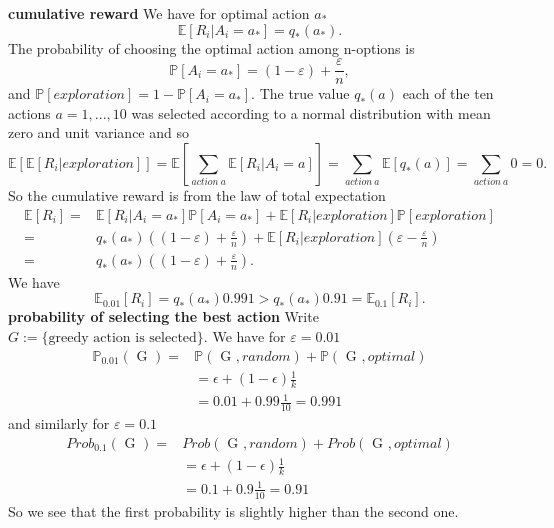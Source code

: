 \documentclass[answers]{exam}
\theoremstyle{definition}
\theoremstyle{remark}
\newcommand{\Prob}{\mathbb{P}}
\newcommand{\Proba}[1]{\mathbb{P}\left[#1\right]}
\newcommand{\Exp}{\mathbb{E}}
\newcommand{\Expe}[1]{\mathbb{E}\left[ #1\right] }
\newcommand{\e}{\varepsilon}
\begin{document}
\begin{solution}
    
\textbf{ cumulative reward}
We have for optimal action $a_{*}$
\begin{equation}
\Expe{R_{i}|A_{i}=a_{*}}=q_{*}(a_{*}).    
\end{equation}
The probability of choosing the optimal action among n-options is
\begin{equation}
\Proba{A_{i}=a_{*}}=(1-\e)+\frac{\e}{n},
\end{equation}
and $\Proba{exploration}=1- \Proba{A_{i}=a_{*}}$. The true value $q_{*}(a)$ each of the ten actions $a=1,...,10$ was selected according to a normal distribution with mean zero and unit variance and so
\begin{equation}
\Expe{\Expe{R_{i}|exploration}}=\Expe{\sum_{action~a}\Expe{R_{i}|A_{i}=a}} =\sum_{action~a}\Expe{q_{*}(a)}=\sum_{action~a}0=0.   
\end{equation}
So the cumulative reward is from the law of total expectation
\begin{align*}
\Expe{R_{i}}=&\Expe{R_{i}|A_{i}=a_{*}}\Proba{A_{i}=a_{*}}+\Expe{R_{i}|exploration}\Proba{exploration}\\    
=&q_{*}(a_{*})((1-\e)+\frac{\e}{n})+\Expe{R_{i}|exploration}(\e-\frac{\e}{n})\\   
=&q_{*}(a_{*})((1-\e)+\frac{\e}{n}).
\end{align*}
We have
\begin{equation}
\Exp_{0.01}[R_{i}]=q_{*}(a_{*})0.991>q_{*}(a_{*})0.91=\Exp_{0.1}[R_{i}].   
\end{equation}
\textbf{probability of selecting the best action}
Write $G:=\{\text{greedy action is selected}\}$. We have for $\e=0.01$
\begin{align*}
\Prob_{0.01}(\text{ G })=&\Prob(\text{ G },random)+\Prob(\text{ G },optimal)    \\
&=\epsilon+(1-\epsilon)\frac{1}{k}\\
&=0.01+0.99\frac{1}{10}=0.991
\end{align*}  
and similarly for $\e=0.1$
\begin{align*}
Prob_{0.1}(\text{ G })=&Prob(\text{ G },random)+Prob(\text{ G },optimal)    \\
&=\epsilon+(1-\epsilon)\frac{1}{k}\\
&=0.1+0.9\frac{1}{10}=0.91
\end{align*}  
So we see that the first probability is slightly higher than the second one.



\end{solution}
\end{document}
